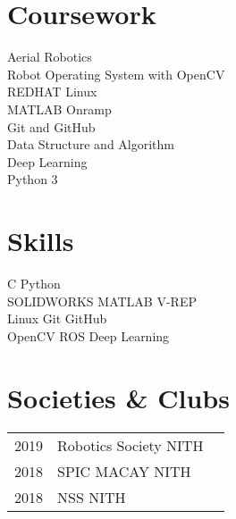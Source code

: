 \documentclass[]{deedy-resume-openfont}
\begin{document}
\begin{minipage}[t]{0.33\textwidth}

\section{Coursework}
Aerial Robotics\\
Robot Operating System with OpenCV\\
REDHAT Linux\\ 
MATLAB Onramp\\ 
Git and GitHub\\
Data Structure and Algorithm\\
Deep Learning\\
Python 3\\
\sectionsep



\section{Skills}
C  \textbullet{} Python \\
SOLIDWORKS \textbullet{} MATLAB \textbullet{} V-REP\\ \textbullet{} Linux \textbullet{} Git \textbullet{} GitHub \\
OpenCV \textbullet{} ROS \textbullet{} Deep Learning 
\sectionsep

\section{Societies & Clubs} 
\begin{tabular}{rll}
2019	     & Robotics Society NITH\\
2018	     & SPIC MACAY NITH\\
2018	     & NSS NITH\\
\end{tabular}
\sectionsep

%
%

\end{minipage} 
\hfill
\end{document}
